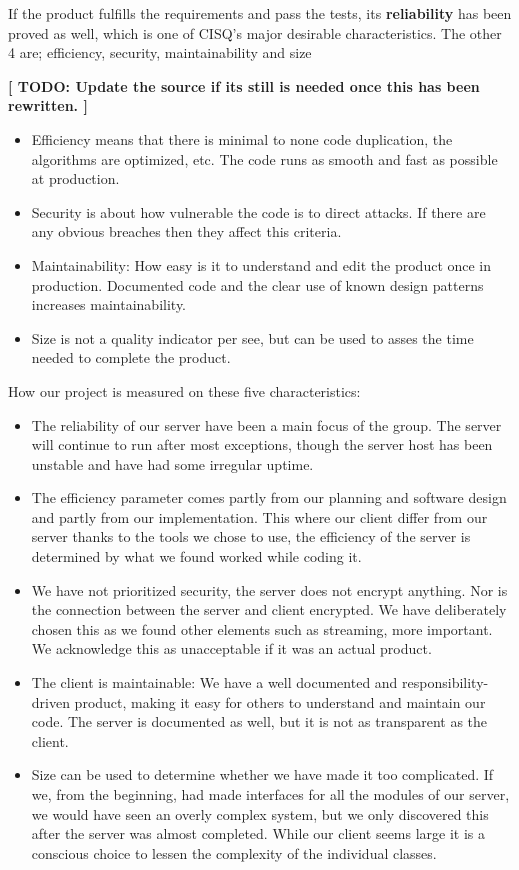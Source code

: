 If the product fulfills the requirements and pass the tests, its \textbf{reliability} has been proved as well, which is one of CISQ's  major desirable characteristics. The other 4 are; efficiency, security, maintainability and size \cite{CISQ}

\textbf{[ TODO: Update the source if its still is needed once this has been rewritten. ]}

\begin{itemize}
	\item Efficiency means that there is minimal to none code duplication, the algorithms are optimized, etc. The code runs as smooth and fast as possible at production.
	\item Security is about how vulnerable the code is to direct attacks. If there are any obvious breaches then they affect this criteria.
	\item Maintainability: How easy is it to understand and edit the product once in production. Documented code and the clear use of known design patterns increases maintainability. 
	\item Size is not a quality indicator per see, but can be used to asses the time needed to complete the product.
\end{itemize}

How our project is measured on these five characteristics:
\begin{itemize}
 	\item The reliability of our server have been a main focus of the group. The server will continue to run after most exceptions, though the server host has been unstable and have had some irregular uptime.
 	\item The efficiency parameter comes partly from our planning and software design and partly from our implementation. This where our client differ from our server thanks to the tools we chose to use, the efficiency of the server is determined by what we found worked while coding it.
 	\item We have not prioritized security, the server does not encrypt anything. Nor is the connection between the server and client encrypted. We have deliberately chosen this as we found other elements such as streaming, more important. We acknowledge this as unacceptable if it was an actual product.  
 	\item The client is maintainable: We have a well documented and responsibility-driven product, making it easy for others to understand and maintain our code. The server is documented as well, but it is not as transparent as the client.
	\item Size can be used to determine whether we have made it too complicated. If we, from the beginning, had made interfaces for all the modules of our server, we would have seen an overly complex system, but we only discovered this after the server was almost completed. While our client seems large it is a conscious choice to lessen the complexity of the individual classes.  
\end{itemize}
\newpage